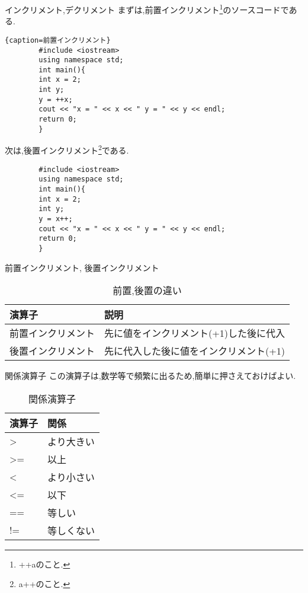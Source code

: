 \documentclass[xdvipdfmx, 8pt, t]{beamer}
\begin{document}
\begin{frame}[fragile]{インクリメント,デクリメント}
    \tiny
    まずは,前置インクリメント\footnote{++aのこと.}のソースコードである.
    
    \begin{lstlisting}{caption=前置インクリメント}
        #include <iostream>
        using namespace std;
        int main(){
        int x = 2;
        int y;
        y = ++x;
        cout << "x = " << x << " y = " << y << endl;
        return 0;
        }
    \end{lstlisting}
    次は,後置インクリメント\footnote{a++のこと.}である.
    \begin{lstlisting}
        #include <iostream>
        using namespace std;
        int main(){
        int x = 2;
        int y;
        y = x++;
        cout << "x = " << x << " y = " << y << endl;
        return 0;
        }
    \end{lstlisting}
\end{frame}

\begin{frame}{前置インクリメント, 後置インクリメント}
\begin{table}[]
    \centering
    \begin{tabular}{|l|l|}
    \hline
        演算子 & 説明\\
        \hline
       前置インクリメント  & 先に値をインクリメント(+1)した後に代入 \\
       後置インクリメント  & 先に代入した後に値をインクリメント(+1)\\
       \hline
    \end{tabular}
    \caption{前置,後置の違い}
    \label{tab:my_label}
\end{table}
    
\end{frame}

\begin{frame}{関係演算子}
この演算子は,数学等で頻繁に出るため,簡単に押さえておけばよい.
    \begin{table}[]
        \centering
        \begin{tabular}{|l|l|}
        \hline
        演算子 & 関係\\
        \hline
        > & より大きい\\
        >= & 以上\\
        < & より小さい\\
        <= & 以下\\
        == & 等しい\\
        != & 等しくない\\
        \hline
        \end{tabular}
        \caption{関係演算子}
        \label{tab:my_label}
    \end{table}
\end{frame}
\end{document}
